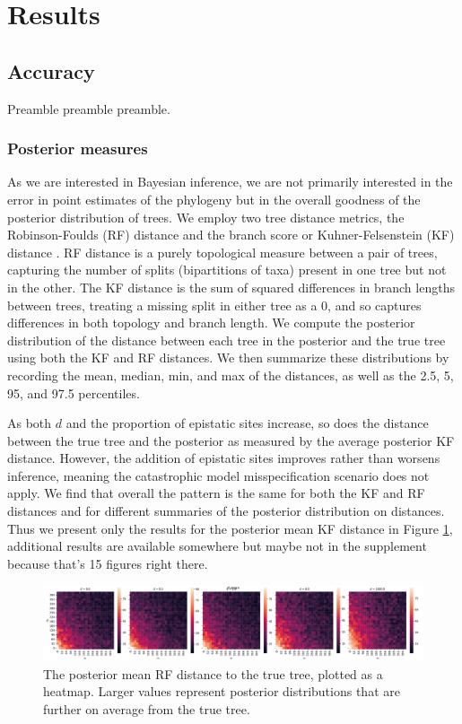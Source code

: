 \documentclass[11pt]{article}
\begin{document}
\section*{Results\label{sec:results}}

\subsection*{Accuracy\label{sec:error}}
Preamble preamble preamble.

\subsubsection*{Posterior measures\label{sec:tree_dists}}
As we are interested in Bayesian inference, we are not primarily interested in the error in point estimates of the phylogeny but in the overall goodness of the posterior distribution of trees.
We employ two tree distance metrics, the Robinson-Foulds (RF) distance \citep{robinson1981comparison} and the branch score or Kuhner-Felsenstein (KF) distance \citep{kuhner1994simulation}.
RF distance is a purely topological measure between a pair of trees, capturing the number of splits (bipartitions of taxa) present in one tree but not in the other.
The KF distance is the sum of squared differences in branch lengths between trees, treating a missing split in either tree as a 0, and so captures differences in both topology and branch length.
We compute the posterior distribution of the distance between each tree in the posterior and the true tree using both the KF and RF distances.
We then summarize these distributions by recording the mean, median, min, and max of the distances, as well as the 2.5, 5, 95, and 97.5 percentiles.

As both $d$ and the proportion of epistatic sites increase, so does the distance between the true tree and the posterior as measured by the average posterior KF distance.
However, the addition of epistatic sites improves rather than worsens inference, meaning the catastrophic model misspecification scenario does not apply.
We find that overall the pattern is the same for both the KF and RF distances and for different summaries of the posterior distribution on distances.
Thus we present only the results for the posterior mean KF distance in Figure \ref{fig:rf_mean}, additional results are available somewhere but maybe not in the supplement because that's 15 figures right there.

\begin{figure}
  \centering
  \includegraphics[width=\textwidth]{figures/agg_rf_mean.pdf}
  \caption{
  The posterior mean RF distance to the true tree, plotted as a heatmap.
  Larger values represent posterior distributions that are further on average from the true tree.
  }
  \label{fig:rf_mean}
\end{figure}
\end{document}
